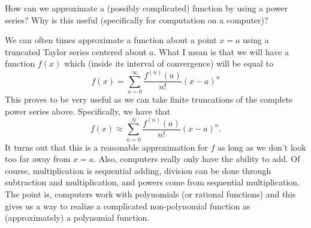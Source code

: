\documentclass[12pt]{article} %
\begin{document}
\newpage
\begin{problem}
How can we approximate a (possibly complicated) function by using a power series? Why is this useful (specifically for computation on a computer)?
\end{problem}
\begin{solution}
We can often times approximate a function about a point $x=a$ using a truncated Taylor series centered about $a$. What I mean is that we will have a function $f(x)$ which (inside its interval of convergence) will be equal to
\[
f(x)=\sum_{n=0}^\infty \frac{f^{(n)}(a)}{n!}(x-a)^n
\]
This proves to be very useful as we can take finite truncations of the complete power series above. Specifically, we have that
\[
f(x)\approx \sum_{n=0}^N \frac{f^{(n)}(a)}{n!}(x-a)^n.
\]
It turns out that this is a reasonable approximation for $f$ as long as we don't look too far away from $x=a$.  Also, computers really only have the ability to add.  Of course, multiplication is sequential adding, division can be done through subtraction and multiplication, and powers come from sequential multiplication.  The point is, computers work with polynomials (or rational functions) and this gives us a way to realize a complicated non-polynomial function as (approximately) a polynomial function.
\end{solution}
\end{document}
